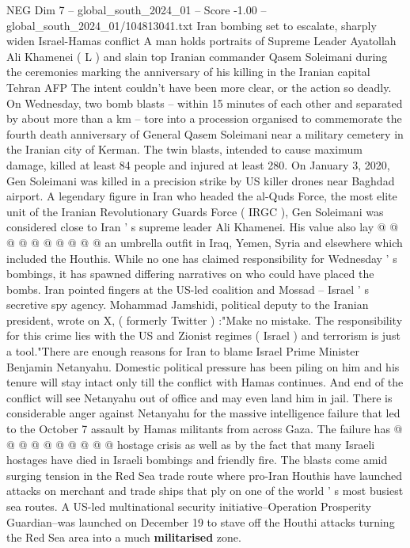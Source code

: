 \begin{textsample}{NEG Dim 7 – global\_south\_2024\_01 – Score -1.00 – global\_south\_2024\_01/104813041.txt}  \label{ex:f7_neg_141}
Iran bombing set to escalate, sharply widen Israel-Hamas conflict A man holds portraits of Supreme Leader Ayatollah Ali Khamenei ( L ) and slain top Iranian commander Qasem Soleimani during the ceremonies marking the anniversary of his killing in the Iranian capital Tehran AFP The intent couldn't have been more clear, or the action so deadly.
On Wednesday, two bomb blasts -- within 15 minutes of each other and separated by about more than a km -- tore into a procession organised to commemorate the fourth death anniversary of General Qasem Soleimani near a military cemetery in the Iranian city of Kerman.
The twin blasts, intended to cause maximum damage, killed at least 84 people and injured at least 280.
On January 3, 2020, Gen Soleimani was killed in a precision strike by US killer drones near Baghdad airport.
A legendary figure in Iran who headed the al-Quds Force, the most elite unit of the Iranian Revolutionary Guards Force ( IRGC ), Gen Soleimani was considered close to Iran ' s supreme leader Ali Khamenei.
His value also lay @ @ @ @ @ @ @ @ @ @ an umbrella outfit in Iraq, Yemen, Syria and elsewhere which included the Houthis.
While no one has claimed responsibility for Wednesday ' s bombings, it has spawned differing narratives on who could have placed the bombs.
Iran pointed fingers at the US-led coalition and Mossad -- Israel ' s secretive spy agency.
Mohammad Jamshidi, political deputy to the Iranian president, wrote on X, ( formerly Twitter ) :"Make no mistake.
The responsibility for this crime lies with the US and Zionist regimes ( Israel ) and terrorism is just a tool."There are enough reasons for Iran to blame Israel Prime Minister Benjamin Netanyahu.
Domestic political pressure has been piling on him and his tenure will stay intact only till the conflict with Hamas continues.
And end of the conflict will see Netanyahu out of office and may even land him in jail.
There is considerable anger against Netanyahu for the massive intelligence failure that led to the October 7 assault by Hamas militants from across Gaza.
The failure has @ @ @ @ @ @ @ @ @ @ hostage crisis as well as by the fact that many Israeli hostages have died in Israeli bombings and friendly fire.
The blasts come amid surging tension in the Red Sea trade route where pro-Iran Houthis have launched attacks on merchant and trade ships that ply on one of the world ' s most busiest sea routes.
A US-led multinational security initiative--Operation Prosperity Guardian--was launched on December 19 to stave off the Houthi attacks turning the Red Sea area into a much \textbf{militarised} zone.

\end{textsample}
